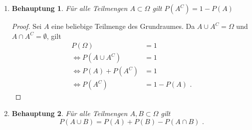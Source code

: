 \documentclass[a4paper]{scrartcl}
\newtheorem*{behaupt}{Behauptung}
\newcommand{\gdw}{\Leftrightarrow}
\begin{document}
\begin{enumerate}[label=\bfseries\arabic*.]
\begin{enumerate}[label=(\roman*)]
            \item
                \begin{behaupt}
                    Für alle Teilmengen $A \subset \Omega$ gilt
                    $P(A^C) = 1 - P(A)$
                \end{behaupt}
                \begin{proof}
                    Sei $A$ eine beliebige Teilmenge des Grundraumes.
                    Da $A \cup A^C = \Omega$ und $A \cap A^C = \emptyset$, gilt
                    \begin{equation}
                        \begin{split}
                            P(\Omega) &= 1 \\
                            \gdw P(A \cup A^C) &= 1 \\
                            \gdw P(A) + P(A^C) &= 1 \\
                            \gdw P(A^C) &= 1 - P(A) \text{ .}
                        \end{split}
                    \end{equation}
                \end{proof}

            \setcounter{enumii}{4}
            \item
                \begin{behaupt}
                    Für alle Teilmengen $A, B \subset \Omega$ gilt
                    \begin{equation}
                        P(A \cup B) = P(A) + P(B) - P(A \cap B) \text{ .}
                    \end{equation}                    


\end{behaupt}
\end{enumerate}
\end{enumerate}
\end{document}
